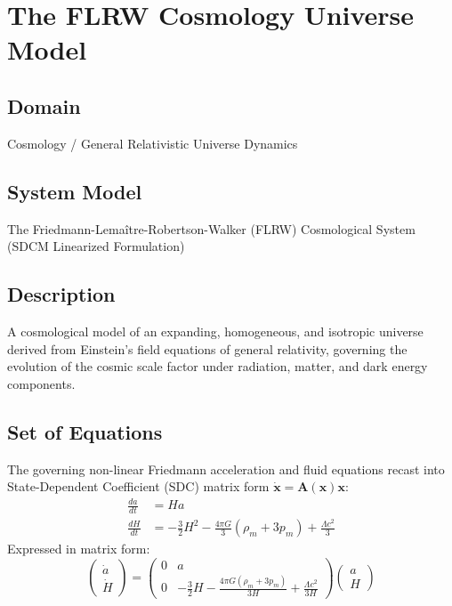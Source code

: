 \chapter{The FLRW Cosmology Universe Model}

\section{Domain}
Cosmology / General Relativistic Universe Dynamics

\section{System Model}
The Friedmann-Lemaître-Robertson-Walker (FLRW) Cosmological System (SDCM Linearized Formulation)

\section{Description}
A cosmological model of an expanding, homogeneous, and isotropic universe derived from Einstein's field equations of general relativity, governing the evolution of the cosmic scale factor under radiation, matter, and dark energy components.

\section{Set of Equations}
The governing non-linear Friedmann acceleration and fluid equations recast into State-Dependent Coefficient (SDC) matrix form $\dot{\mathbf{x}} = \mathbf{A}(\mathbf{x})\mathbf{x}$:
\begin{align}
\frac{da}{dt} &= H a \\
\frac{dH}{dt} &= -\frac{3}{2} H^2 - \frac{4\pi G}{3} (\rho_m + 3p_m) + \frac{\Lambda c^2}{3}
\end{align}
Expressed in matrix form:
\begin{equation}
\begin{pmatrix} \dot{a} \\ \dot{H} \end{pmatrix} = \begin{pmatrix} 0 & a \\ 0 & -\frac{3}{2}H - \frac{4\pi G(\rho_m + 3p_m)}{3H} + \frac{\Lambda c^2}{3H} \end{pmatrix} \begin{pmatrix} a \\ H \end{pmatrix}
\end{equation}

